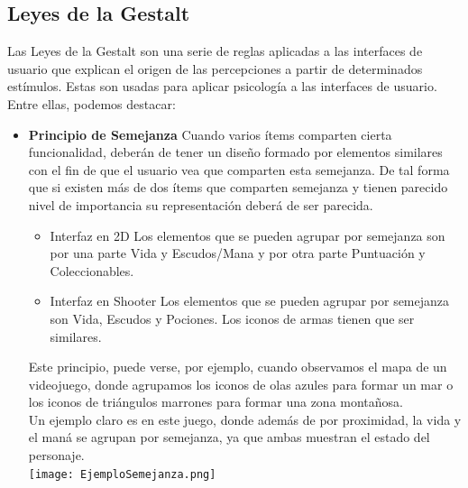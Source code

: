 \subsection{Leyes de la Gestalt}
Las Leyes de la Gestalt\cite{GESTALT} son una serie de reglas aplicadas a las interfaces de usuario que explican el origen de las percepciones a partir de determinados estímulos. Estas son usadas para aplicar psicología a las interfaces de usuario. Entre ellas, podemos destacar: 
\begin{itemize}

\item \textbf{Principio de Semejanza}
Cuando varios ítems comparten cierta funcionalidad, deberán de tener un diseño formado por elementos similares con el fin de que el usuario vea que comparten esta semejanza. De tal forma que si existen más de dos ítems que comparten semejanza y tienen parecido nivel de importancia su representación deberá de ser parecida.
\begin{itemize}
\item Interfaz en 2D
Los elementos que se pueden agrupar por semejanza son por una parte Vida y Escudos/Mana  y por otra parte  Puntuación y Coleccionables.
\end{itemize}
\begin{itemize}
\item Interfaz en Shooter
Los elementos que se pueden agrupar por semejanza son Vida, Escudos y Pociones. Los iconos de armas tienen que ser similares.
\end{itemize}
Este principio, puede verse, por ejemplo, cuando observamos el mapa de un videojuego, donde agrupamos los iconos de olas azules para formar un mar o los iconos de triángulos marrones para formar una zona montañosa.\\

Un ejemplo claro es en este juego, donde además de por proximidad, la vida y el maná se agrupan por semejanza, ya que ambas muestran el estado del personaje.\\
\texttt{[image: EjemploSemejanza.png]}


\end{itemize}
